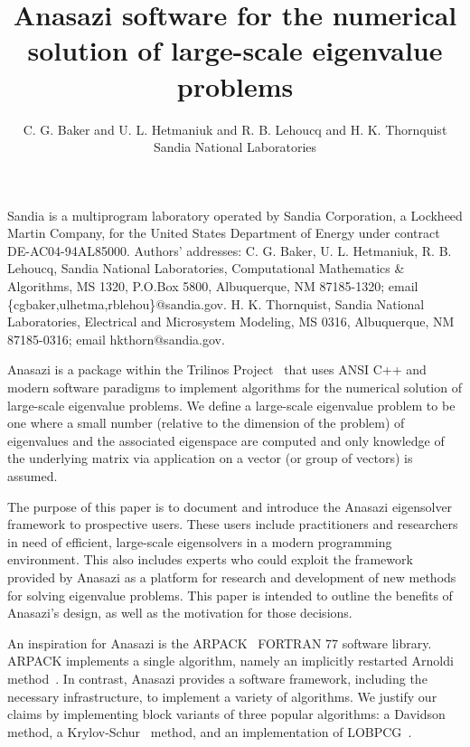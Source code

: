 \documentclass[acmtoms]{acmtrans2m}
\title{Anasazi software for the numerical solution of large-scale eigenvalue problems}
\author{C. G. Baker and
U. L. Hetmaniuk and R. B. Lehoucq and H. K. Thornquist\\ Sandia
National Laboratories}
\newcounter{algorithm}
\begin{document}
\begin{bottomstuff}
Sandia is a multiprogram laboratory operated by Sandia Corporation,
a Lockheed Martin Company, for the United States Department of
Energy under contract DE-AC04-94AL85000. Authors' addresses: C. G.
Baker, U. L. Hetmaniuk, R. B. Lehoucq,
Sandia National Laboratories, Computational Mathematics \&
Algorithms, MS 1320, P.O.Box 5800, Albuquerque, NM 87185-1320; email
\{cgbaker,ulhetma,rblehou\}@sandia.gov. H. K. Thornquist, Sandia National
Laboratories, Electrical and Microsystem Modeling, MS 0316,
Albuquerque, NM 87185-0316; email hkthorn@sandia.gov.

\end{bottomstuff}

\maketitle

Anasazi is a package within the Trilinos Project~\cite{Heroux:2005:OTP} that uses ANSI C++
and modern software paradigms to implement algorithms for the numerical solution of
large-scale eigenvalue problems. We define a large-scale eigenvalue problem to be one
where a small number (relative to the dimension of the problem) of eigenvalues and the
associated eigenspace are computed and only knowledge of the underlying matrix via
application on a vector (or group of vectors) is assumed.

The purpose of this paper is to document and introduce the Anasazi eigensolver framework to prospective
users. These users include practitioners and researchers in need of efficient, large-scale
eigensolvers in a modern programming environment. This also includes experts who could exploit the framework provided by
Anasazi as a platform for research and development of new methods for solving eigenvalue
problems. This paper is intended to outline the benefits of Anasazi's design, as well as
the motivation for those decisions. 

An inspiration for Anasazi is the ARPACK~\cite{lesy:98} FORTRAN 77 software library.
ARPACK implements a single algorithm, namely an implicitly restarted Arnoldi
method~\cite{sore:92}. In contrast, Anasazi provides a software framework, including the
necessary infrastructure, to implement a variety of algorithms. We justify our claims by
implementing block variants of three popular algorithms: a Davidson~\cite{morganscott:86} method,
a Krylov-Schur~\cite{stew:01} method, and an implementation of LOBPCG~\cite{knya:01}.
\end{document}

